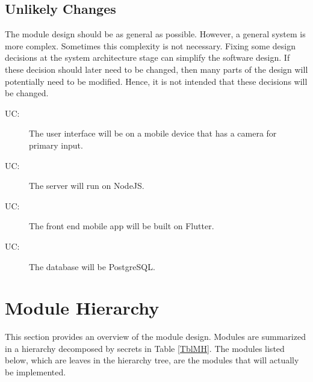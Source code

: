 \documentclass[12pt, titlepage]{article}
\newcounter{ucnum}
\newcommand{\uctheucnum}{UC\theucnum}
\begin{document}
\subsection{Unlikely Changes} \label{SecUchange}

The module design should be as general as possible. However, a general system is
more complex. Sometimes this complexity is not necessary. Fixing some design
decisions at the system architecture stage can simplify the software design. If
these decision should later need to be changed, then many parts of the design
will potentially need to be modified. Hence, it is not intended that these
decisions will be changed.

\begin{description}
\item[ \uctheucnum \label{ucIO}:] The user interface will be on a mobile device that has a camera for primary input.
\item[ \uctheucnum \label{ucIO}:] The server will run on NodeJS.
\item[ \uctheucnum \label{ucIO}:] The front end mobile app will be built on Flutter.
\item[ \uctheucnum \label{ucIO}:] The database will be PostgreSQL.

\end{description}

\section{Module Hierarchy} \label{SecMH}

This section provides an overview of the module design. Modules are summarized
in a hierarchy decomposed by secrets in Table \ref{TblMH}. The modules listed
below, which are leaves in the hierarchy tree, are the modules that will
actually be implemented.
\end{document}
